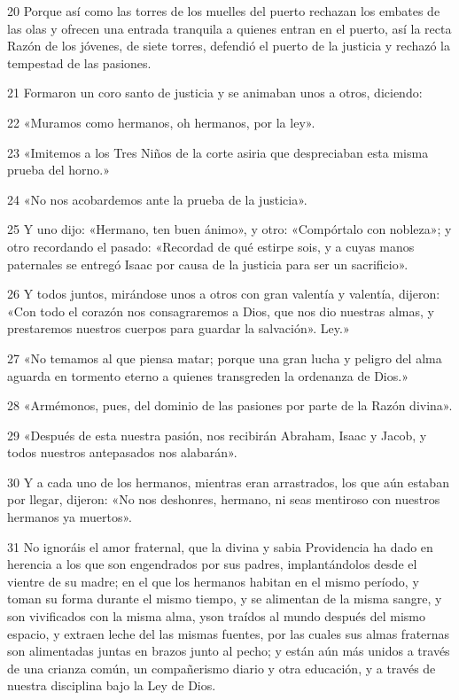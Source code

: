 \par 20 Porque así como las torres de los muelles del puerto rechazan los embates de las olas y ofrecen una entrada tranquila a quienes entran en el puerto, así la recta Razón de los jóvenes, de siete torres, defendió el puerto de la justicia y rechazó la tempestad de las pasiones.

\par 21 Formaron un coro santo de justicia y se animaban unos a otros, diciendo:

\par 22 «Muramos como hermanos, oh hermanos, por la ley».

\par 23 «Imitemos a los Tres Niños de la corte asiria que despreciaban esta misma prueba del horno.»

\par 24 «No nos acobardemos ante la prueba de la justicia».

\par 25 Y uno dijo: «Hermano, ten buen ánimo», y otro: «Compórtalo con nobleza»; y otro recordando el pasado: «Recordad de qué estirpe sois, y a cuyas manos paternales se entregó Isaac por causa de la justicia para ser un sacrificio».

\par 26 Y todos juntos, mirándose unos a otros con gran valentía y valentía, dijeron: «Con todo el corazón nos consagraremos a Dios, que nos dio nuestras almas, y prestaremos nuestros cuerpos para guardar la salvación». Ley.»

\par 27 «No temamos al que piensa matar; porque una gran lucha y peligro del alma aguarda en tormento eterno a quienes transgreden la ordenanza de Dios.»

\par 28 «Armémonos, pues, del dominio de las pasiones por parte de la Razón divina».

\par 29 «Después de esta nuestra pasión, nos recibirán Abraham, Isaac y Jacob, y todos nuestros antepasados ​​nos alabarán».

\par 30 Y a cada uno de los hermanos, mientras eran arrastrados, los que aún estaban por llegar, dijeron: «No nos deshonres, hermano, ni seas mentiroso con nuestros hermanos ya muertos».

\par 31 No ignoráis el amor fraternal, que la divina y sabia Providencia ha dado en herencia a los que son engendrados por sus padres, implantándolos desde el vientre de su madre; en el que los hermanos habitan en el mismo período, y toman su forma durante el mismo tiempo, y se alimentan de la misma sangre, y son vivificados con la misma alma, y ​​son traídos al mundo después del mismo espacio, y extraen leche del las mismas fuentes, por las cuales sus almas fraternas son alimentadas juntas en brazos junto al pecho; y están aún más unidos a través de una crianza común, un compañerismo diario y otra educación, y a través de nuestra disciplina bajo la Ley de Dios.

